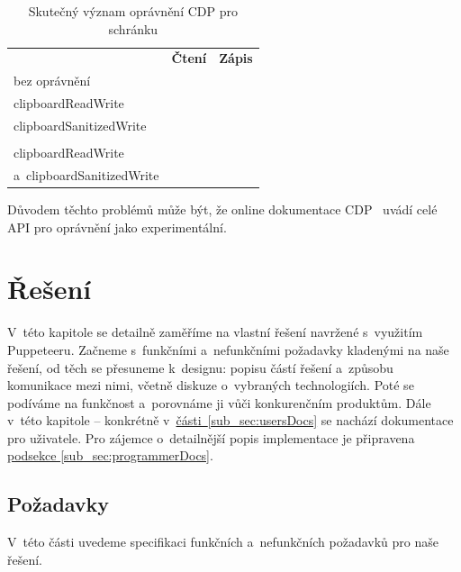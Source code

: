 \documentclass[12pt, a4paper, twoside]{article}
\newcommand{\cmark}{\ding{51}}
\newcommand{\xmark}{\ding{55}}
\newcommand{\refAddedText}[3]{\hyperref[#1]{#2\ref{#1}#3}}
\begin{document}
	\begin{table}[H]
		\centering
	\begin{tabular}{ lcc }
		\rowcolor{tableHeadingBackground}
		\multicolumn{1}{l}{\textbf{Udělená oprávnění}} & \multicolumn{1}{l}{\textbf{Čtení}} & \multicolumn{1}{l}{\textbf{Zápis}} \\
		bez oprávnění & \xmark & \cmark \\
		clipboardReadWrite & \cmark & \xmark \\
		clipboardSanitizedWrite & \xmark & \cmark \\
		& & \\
		clipboardReadWrite & \multirow{2}{*}{\cmark} &  \multirow{2}{*}{\cmark} \\
		a~clipboardSanitizedWrite & &  \\
		\end{tabular}
	\caption{Skutečný význam oprávnění CDP pro schránku}
	\end{table}
	Důvodem těchto problémů může být, že online dokumentace CDP~\cite{devtoolsProtocol} uvádí celé API pro oprávnění jako experimentální.
	\section{Řešení}
	\label{section:ourSolution}
	V~této kapitole se detailně zaměříme na vlastní řešení navržené s~využitím Puppeteeru. Začneme s~funkčními a~nefunkčními požadavky kladenými na naše řešení, od těch se přesuneme k~designu: popisu částí řešení a~způsobu komunikace mezi nimi, včetně diskuze o~vybraných technologiích. Poté se podíváme na funkčnost a~porovnáme ji vůči konkurenčním produktům. Dále v~této kapitole -- konkrétně v~\refAddedText{sub_sec:usersDocs}{části~}{} se nachází dokumentace pro uživatele. Pro zájemce o~detailnější popis implementace je připravena \refAddedText{sub_sec:programmerDocs}{podsekce }{}.
	\subsection{Požadavky}
	\label{sub_sec:requirements}
	V~této části uvedeme specifikaci funkčních a~nefunkčních požadavků pro naše řešení. 
\end{document}
